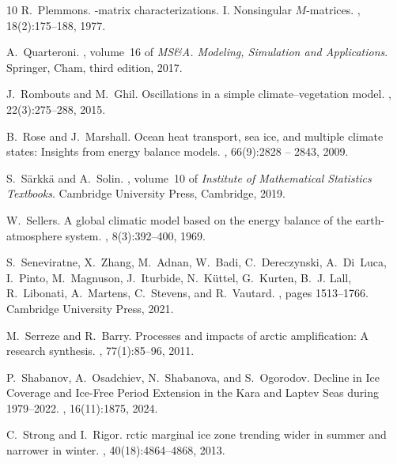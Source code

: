 \documentclass[10pt]{amsart}
\numberwithin{equation}{section}
\begin{document}
\begin{thebibliography}{10}
R.~Plemmons.
-matrix characterizations. {I}. {N}onsingular {$M$}-matrices.
, 18(2):175--188, 1977.

A.~Quarteroni.
, volume~16 of {\em
  MS\&A. Modeling, Simulation and Applications}.
\newblock Springer, Cham, third edition, 2017.

J.~Rombouts and M.~Ghil.
\newblock Oscillations in a simple climate–vegetation model.
, 22(3):275--288, 2015.

B.~Rose and J.~Marshall.
\newblock Ocean heat transport, sea ice, and multiple climate states: Insights
  from energy balance models.
, 66(9):2828 -- 2843, 2009.

S.~S\"arkk\"a and A.~Solin.
, volume~10 of {\em
  Institute of Mathematical Statistics Textbooks}.
\newblock Cambridge University Press, Cambridge, 2019.

W.~Sellers.
\newblock A global climatic model based on the energy balance of the
  earth-atmosphere system.
, 8(3):392--400,
  1969.

S.~Seneviratne, X.~Zhang, M.~Adnan, W.~Badi, C.~Dereczynski, A.~Di~Luca,
  I.~Pinto, M.~Magnuson, J.~Iturbide, N.~Küttel, G.~Kurten, B.~J. Lall,
  R.~Libonati, A.~Martens, C.~Stevens, and R.~Vautard.
, pages
  1513--1766.
\newblock Cambridge University Press, 2021.

M.~Serreze and R.~Barry.
\newblock Processes and impacts of arctic amplification: A research synthesis.
, 77(1):85--96, 2011.

P.~Shabanov, A.~Osadchiev, N.~Shabanova, and S.~Ogorodov.
\newblock Decline in {I}ce {C}overage and {I}ce-{F}ree {P}eriod {E}xtension in
  the {K}ara and {L}aptev {S}eas during 1979–2022.
, 16(11):1875, 2024.

C.~Strong and I.~Rigor.
rctic marginal ice zone trending wider in summer and narrower in
  winter.
, 40(18):4864--4868, 2013.


\end{thebibliography}
\end{document}
